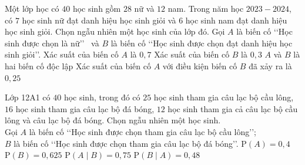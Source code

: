 \begin{ex}%
	Một lớp học có $40$ học  sinh gồm $28$ nữ và $12$ nam. Trong năm học $2023-2024$, có $7$ học sinh
	nữ đạt danh hiệu học sinh giỏi và $6$ học sinh nam đạt danh hiệu học sinh giỏi. Chọn  ngẫu nhiên một
	học sinh của lớp đó. Gọi $A$ là biến cố \lq\lq Học sinh được chọn là nữ\rq\rq~ và $B$ là biến cố \lq\lq  Học sinh được
	chọn đạt danh hiệu học sinh giỏi\rq\rq. 
	 \choiceTF
		{\True Xác suất của  biến cố $A$ là $0{,}7$}
		{Xác suất của biến cố $B$ là $0{,}3$} 
		{$A$ và $B$  là hai biến cố độc lập}
		{Xác suất của biến cố $A$ với điều kiện biến cố $B$ đã xảy  ra là $0{,}25$}
\end{ex}

\begin{ex}%
	Lớp 12A1 có $40$ học sinh, trong đó có $25$ học sinh tham gia câu lạc bộ cầu lông, $16$ học sinh tham gia câu lạc bộ đá bóng, $12$ học sinh tham gia cả câu lạc bộ cầu lông và câu lạc bộ đá bóng. Chọn ngẫu nhiên một học  sinh.\\
	Gọi $A$ là biến  cố \lq\lq Học sinh được chọn tham gia câu lạc bộ cầu lông\rq\rq;\\
	 $B$ là biến cố \lq\lq Học sinh được chọn tham gia câu lạc bộ đá bóng\rq\rq.
	 \choiceTF
		 {$\mathrm{P}(A)=0{,}4$}
		 {$\mathrm{P}(B)=0{,}625$}
		 {\True $\mathrm{P}(A\mid B)=0{,}75$}
		{\True  $\mathrm{P}(B\mid A)=0{,}48$}
\end{ex}

